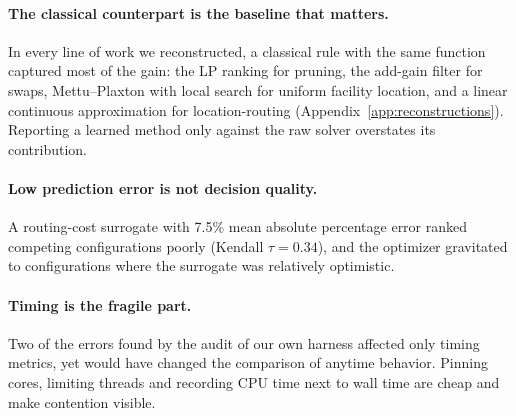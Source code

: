 \paragraph{The classical counterpart is the baseline that matters.}
In every line of work we reconstructed, a classical rule with the same function captured most of
the gain: the LP ranking for pruning, the add-gain filter for swaps, Mettu--Plaxton with local
search for uniform facility location, and a linear continuous approximation for location-routing
(Appendix~\ref{app:reconstructions}). Reporting a learned method only against the raw solver
overstates its contribution.

\paragraph{Low prediction error is not decision quality.}
A routing-cost surrogate with 7.5\% mean absolute percentage error ranked competing
configurations poorly (Kendall $\tau=0.34$), and the optimizer gravitated to configurations where
the surrogate was relatively optimistic.

\paragraph{Timing is the fragile part.}
Two of the errors found by the audit of our own harness affected only timing metrics, yet would
have changed the comparison of anytime behavior. Pinning cores, limiting threads and recording CPU
time next to wall time are cheap and make contention visible.

